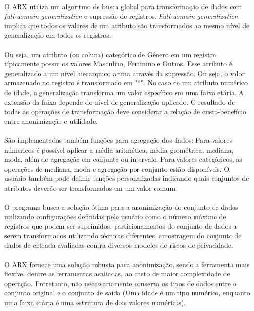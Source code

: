 \paragraph{} O ARX utiliza um algoritmo de busca global para transformação de dados com \textit{full-domain generalization} e supressão de registros. \textit{Full-domain generalization} implica que todos os  valores de um atributo são transformados ao mesmo nível de generalização em todos os registros.

\paragraph{} Ou seja, um atributo (ou coluna) categórico de Gênero em um registro típicamente possui os valores Masculino, Feminino e Outros. Esse atributo é generalizado a um nível hierarquico acima através da supressão. Ou seja, o valor armazenado no registro é transformado em "*". No caso de um atributo numérico de idade, a generalização transforma um valor específico em uma faixa etária. A extensão da faixa depende do nível de generalização aplicado. O resultado de todas as operações de transformação deve considerar a relação de custo-benefício entre anonimização e utilidade.

\paragraph{} São implementadas também funções para agregação dos dados: Para valores númericos é possível aplicar a média aritmética, média geométrica, mediana, moda, além de agregação em conjunto ou intervalo. Para valores categóricos, as operações de mediana, moda e agregação por conjunto estão disponíveis. O usuário também pode definir funções personalizadas indicando quais conjuntos de atributos deverão ser transformados em um valor comum.

\paragraph{} O programa busca a solução ótima para a anonimização do conjunto de dados utilizando configurações definidas pelo usuário como o número máximo de registros que podem ser suprimidos, particionamentos do conjunto de dados a serem transformados utilizando técnicas diferentes, amostragem do conjunto de dados de entrada avaliadas contra diversos modelos de riscos de privacidade.

\paragraph{} O ARX fornece uma solução robusta para anonimização, sendo a ferramenta mais flexível dentre as ferramentas avaliadas, ao custo de maior complexidade de operação. Entretanto, não necessariamente conserva os tipos de dados entre o conjunto original e o conjunto de saída (Uma idade é um tipo numérico, enquanto uma faixa etária é uma estrutura de dois valores numéricos).

